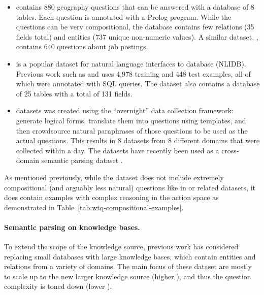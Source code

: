\begin{itemize}
\item {} \cite{zelle96geoquery} contains
880 geography questions that can be answered with a database
of 8 tables.
Each question is annotated with a Prolog program.
While the questions can be very compositional,
the database contains few relations (35 fields total)
and entities (737 unique non-numeric values).
A similar dataset,  \cite{tang01ilp},
contains 640 questions about job postings.

\item {} \cite{dahl1994expanding}
is a popular dataset for 
natural language interfaces to database (NLIDB).
Previous work such as \citet{he2006spoken}
and \citet{zettlemoyer07relaxed}
uses 4,978 training and 448 test examples,
all of which were annotated with SQL queries.
The dataset also contains a database of 25 tables
with a total of 131 fields. %

\item {} \cite{wang2015overnight} datasets
was created using the ``overnight'' data collection framework:
generate logical forms,
translate them into questions using templates,
and then crowdsource natural paraphrases
of those questions to be used as the actual questions.
This results in 8 datasets from 8 different domains
that were collected within a day.
The datasets have recently been used as a
cross-domain semantic parsing dataset
\cite{su2017cross,herzig2018zeroshot}.

\end{itemize}

As mentioned previously, while the \wtq dataset does not include
extremely compositional (and arguably less natural) questions
like in  or related datasets,
it does contain examples with complex reasoning 
in the action space as demonstrated in Table~\ref{tab:wtq-compositional-examples}.

\paragraph{Semantic parsing on knowledge bases.}
To extend the scope of the knowledge source,
previous work has considered replacing small databases
with large knowledge bases,
which contain entities and relations
from a variety of domains.
The main focus of these dataset are mostly to scale
up to the new larger knowledge source (higher \Breadth),
and thus the question complexity is toned down
(lower \Depth).

